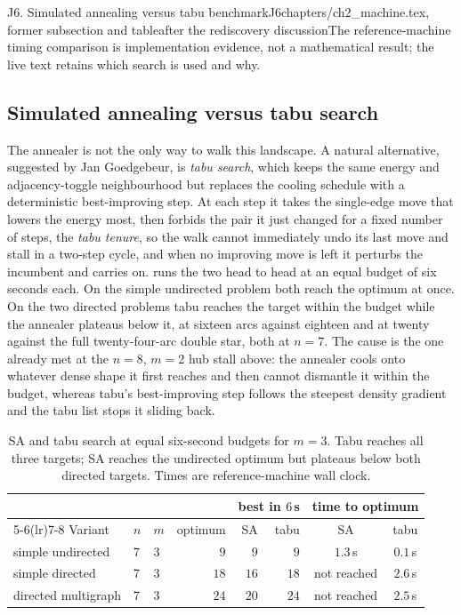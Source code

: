 \begin{offcut}{J6. Simulated annealing versus tabu benchmark}{J6}{chapters/ch2\_machine.tex, former subsection and table}{after the rediscovery discussion}{The reference-machine timing comparison is implementation evidence, not a mathematical result; the live text retains which search is used and why.}
\subsection{Simulated annealing versus tabu search}

The annealer is not the only way to walk this landscape. A natural alternative, suggested by Jan Goedgebeur, is \emph{tabu search}, which keeps the same energy and adjacency-toggle neighbourhood but replaces the cooling schedule with a deterministic best-improving step. At each step it takes the single-edge move that lowers the energy most, then forbids the pair it just changed for a fixed number of steps, the \emph{tabu tenure}, so the walk cannot immediately undo its last move and stall in a two-step cycle, and when no improving move is left it perturbs the incumbent and carries on.  runs the two head to head at an equal budget of six seconds each. On the simple undirected problem both reach the optimum at once. On the two directed problems tabu reaches the target within the budget while the annealer plateaus below it, at sixteen arcs against eighteen and at twenty against the full twenty-four-arc double star, both at $n = 7$. The cause is the one already met at the $n = 8$, $m = 2$ hub stall above: the annealer cools onto whatever dense shape it first reaches and then cannot dismantle it within the budget, whereas tabu's best-improving step follows the steepest density gradient and the tabu list stops it sliding back.

\begin{table}[ht]
    \centering
    \begin{tabular}{lllrrrcc}
        \toprule
         & & & & \multicolumn{2}{c}{best in $6$\,s} & \multicolumn{2}{c}{time to optimum} \\
        \cmidrule(lr){5-6}\cmidrule(lr){7-8}
        Variant & $n$ & $m$ & optimum & SA & tabu & SA & tabu \\
        \midrule
        simple undirected   & 7 & 3 & $9$  & $9$  & $9$  & $1.3$\,s & $0.1$\,s \\
        simple directed     & 7 & 3 & $18$ & $16$ & $18$ & not reached & $2.6$\,s \\
        directed multigraph & 7 & 3 & $24$ & $20$ & $24$ & not reached & $2.5$\,s \\
        \bottomrule
    \end{tabular}
    \caption{SA and tabu search at equal six-second budgets for $m=3$. Tabu reaches all three targets; SA reaches the undirected optimum but plateaus below both directed targets. Times are reference-machine wall clock.}
    \label{tab:sa-vs-tabu}
\end{table}


\end{offcut}
